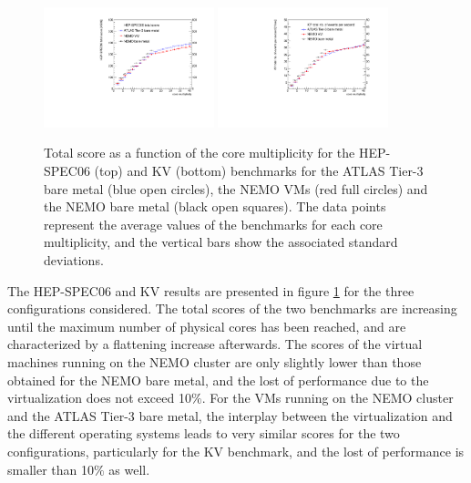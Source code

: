 \begin{figure}[htbp]
\centering
\includegraphics[width=0.44\textwidth]{figures/benchmark-hepspec06-total.pdf}
\includegraphics[width=0.44\textwidth]{figures/kv-BFG-BM-NEMO-VM-NEMO-BM-total.pdf} 
\caption{Total score as a function of the core multiplicity for the HEP-SPEC06 (top) and KV (bottom) benchmarks for the ATLAS Tier-3 bare metal (blue open circles),
the NEMO VMs (red full circles) and the NEMO bare metal (black open squares). The data points represent the average values of the benchmarks for each core multiplicity,
and the vertical bars show the associated standard deviations.}
\label{bmk-total}
\end{figure}

The HEP-SPEC06 and KV results are presented in figure \ref{bmk-total} for the three configurations considered.
The total scores of the two benchmarks are increasing until the maximum number of physical cores has been reached, and are characterized by a flattening increase afterwards.
The scores of the virtual machines running on the NEMO cluster are only slightly lower than those obtained for the NEMO bare metal, and the lost of performance
due to the virtualization does not exceed 10$\%$.
For the VMs running on the NEMO cluster and the ATLAS Tier-3 bare metal, the interplay between the virtualization and the different operating systems leads to very similar scores
for the two configurations, particularly for the KV benchmark, and the lost of performance is smaller than 10$\%$ as well.


%
%
